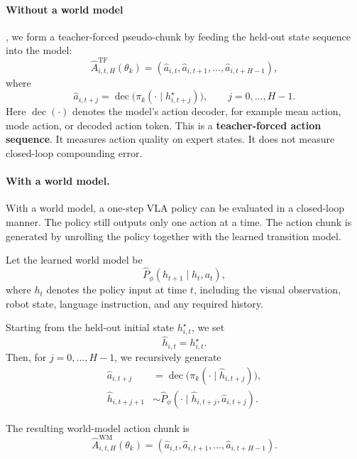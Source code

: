 \documentclass[11pt]{article}
\begin{document}
\paragraph{Without a world model}, we form a teacher-forced pseudo-chunk by feeding the held-out state sequence into the model:
\begin{equation}
\widehat{A}^{\mathrm{TF}}_{i,t,H}(\theta_k)
=
(\hat{a}_{i,t},\hat{a}_{i,t+1},\ldots,\hat{a}_{i,t+H-1}),
\end{equation}
where
\begin{equation}
\hat{a}_{i,t+j}=\operatorname{dec}\bigl(\pi_k(\cdot\mid h^{\star}_{i,t+j})\bigr),
\qquad j=0,\ldots,H-1.
\end{equation}
Here $\operatorname{dec}(\cdot)$ denotes the model's action decoder, for example mean action, mode action, or decoded action token. This is a \textbf{teacher-forced action sequence}. It measures action quality on expert states. It does not measure closed-loop compounding error.


\paragraph{With a world model.}
With a world model, a one-step VLA policy can be evaluated in a closed-loop manner.
The policy still outputs only one action at a time. The action chunk is generated by
unrolling the policy together with the learned transition model.

Let the learned world model be
\begin{equation}
\widehat{P}_{\phi}(h_{t+1}\mid h_t,a_t),
\end{equation}
where $h_t$ denotes the policy input at time $t$, including the visual observation,
robot state, language instruction, and any required history.

Starting from the held-out initial state $h^{\star}_{i,t}$, we set
\begin{equation}
\widehat{h}_{i,t}=h^{\star}_{i,t}.
\end{equation}
Then, for $j=0,\ldots,H-1$, we recursively generate
\begin{align}
\widehat{a}_{i,t+j}
&=
\operatorname{dec}\bigl(\pi_k(\cdot\mid \widehat{h}_{i,t+j})\bigr),
\\
\widehat{h}_{i,t+j+1}
&\sim
\widehat{P}_{\phi}(\cdot\mid \widehat{h}_{i,t+j},\widehat{a}_{i,t+j}).
\end{align}

The resulting world-model action chunk is
\begin{equation}
\widehat{A}^{\mathrm{WM}}_{i,t,H}(\theta_k)
=
(\widehat{a}_{i,t},\widehat{a}_{i,t+1},\ldots,\widehat{a}_{i,t+H-1}).
\end{equation}
\end{document}
